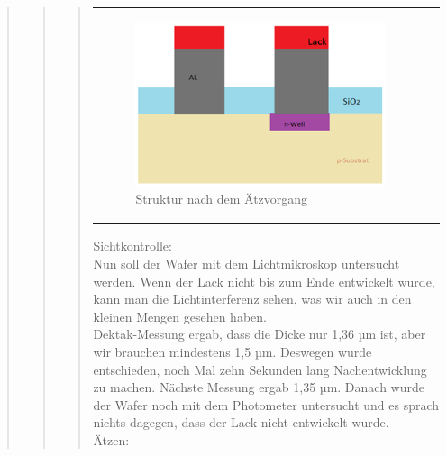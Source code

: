 \begin{quote}
\begin{quote}
\begin{quote}
\begin{center}
\begin{tabular}{ll}
\begin{minipage}{0.6\textwidth}
                        \begin{figure}[H]
                        \hspace{1em}
                            \includegraphics[scale=0.9, trim = 0cm 0cm 0cm
                            0cm, clip]
                            {./HerstellungBilder/StrukturnachdemAetzvorgang.png}
                            \caption{Struktur nach dem Ätzvorgang}
                           \label{fig:nachAetzen}
                        \end{figure}
                    \vspace{-1.5em}

                    \end{minipage}

                \end{tabular}
			\end{center}
    
    		\vspace{2em}
    		
    		Sichtkontrolle:\\

			Nun soll der Wafer mit dem Lichtmikroskop untersucht werden. Wenn 
			der Lack nicht bis zum Ende entwickelt wurde, kann man die 
			Lichtinterferenz sehen, was wir auch in den kleinen Mengen gesehen 
			haben.\\

			Dektak-Messung ergab, dass die Dicke nur 1,36 µm ist, aber wir 
			brauchen mindestens 1,5 µm. Deswegen wurde entschieden, noch Mal 
			zehn Sekunden lang Nachentwicklung zu machen. Nächste Messung ergab 
			1,35 µm. Danach wurde der Wafer noch mit dem Photometer untersucht 
			und es sprach nichts dagegen, dass der Lack nicht entwickelt wurde.\\ 

			Ätzen:\\


\end{quote}
\end{quote}
\end{quote}
